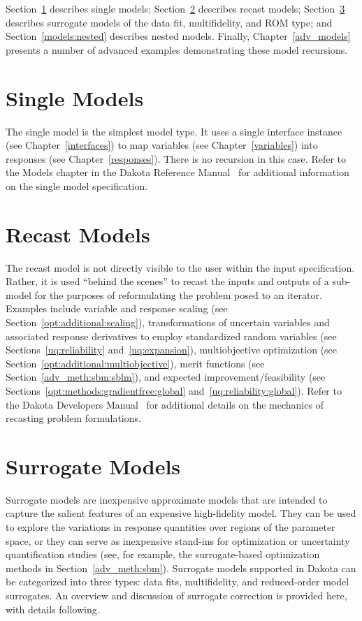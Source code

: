 Section~\ref{models:single} describes single models;
Section~\ref{models:recast} describes recast models;
Section~\ref{models:surrogate} describes surrogate models of the data
fit, multifidelity, and ROM type; and Section~\ref{models:nested}
describes nested models.  Finally, Chapter~\ref{adv_models} presents
a number of advanced examples demonstrating these model recursions.

\section{Single Models}\label{models:single}

The single model is the simplest model type.  It uses a single
interface instance (see Chapter~\ref{interfaces}) to map variables
(see Chapter~\ref{variables}) into responses (see
Chapter~\ref{responses}).  There is no recursion in this case.  Refer
to the Models chapter in the Dakota Reference Manual~\cite{RefMan} for
additional information on the single model specification.

\section{Recast Models}\label{models:recast}

The recast model is not directly visible to the user within the input
specification.  Rather, it is used ``behind the scenes'' to recast the
inputs and outputs of a sub-model for the purposes of reformulating
the problem posed to an iterator.  Examples include variable and
response scaling (see Section~\ref{opt:additional:scaling}),
transformations of uncertain variables and associated response
derivatives to employ standardized random variables (see
Sections~\ref{uq:reliability} and~\ref{uq:expansion}), multiobjective
optimization (see Section~\ref{opt:additional:multiobjective}), merit
functions (see Section~\ref{adv_meth:sbm:sblm}), and expected
improvement/feasibility (see Sections~\ref{opt:methods:gradientfree:global}
and~\ref{uq:reliability:global}).  Refer to the Dakota Developers
Manual~\cite{DevMan} for additional details on the mechanics of
recasting problem formulations.

\section{Surrogate Models}\label{models:surrogate}

Surrogate models are inexpensive approximate models that are intended
to capture the salient features of an expensive high-fidelity model.
They can be used to explore the variations in response quantities over
regions of the parameter space, or they can serve as inexpensive
stand-ins for optimization or uncertainty quantification studies (see,
for example, the surrogate-based optimization methods in
Section~\ref{adv_meth:sbm}).  Surrogate models supported in Dakota can be
categorized into three types: data fits, multifidelity, and
reduced-order model surrogates.  An overview and discussion of
surrogate correction is provided here, with details following.

